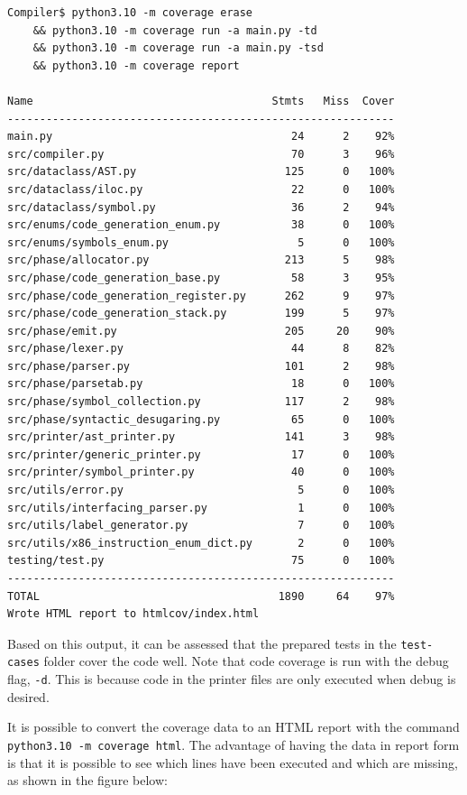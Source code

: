 \begin{verbatim}
Compiler$ python3.10 -m coverage erase
    && python3.10 -m coverage run -a main.py -td
    && python3.10 -m coverage run -a main.py -tsd 
    && python3.10 -m coverage report 

Name                                     Stmts   Miss  Cover
------------------------------------------------------------
main.py                                     24      2    92%
src/compiler.py                             70      3    96%
src/dataclass/AST.py                       125      0   100%
src/dataclass/iloc.py                       22      0   100%
src/dataclass/symbol.py                     36      2    94%
src/enums/code_generation_enum.py           38      0   100%
src/enums/symbols_enum.py                    5      0   100%
src/phase/allocator.py                     213      5    98%
src/phase/code_generation_base.py           58      3    95%
src/phase/code_generation_register.py      262      9    97%
src/phase/code_generation_stack.py         199      5    97%
src/phase/emit.py                          205     20    90%
src/phase/lexer.py                          44      8    82%
src/phase/parser.py                        101      2    98%
src/phase/parsetab.py                       18      0   100%
src/phase/symbol_collection.py             117      2    98%
src/phase/syntactic_desugaring.py           65      0   100%
src/printer/ast_printer.py                 141      3    98%
src/printer/generic_printer.py              17      0   100%
src/printer/symbol_printer.py               40      0   100%
src/utils/error.py                           5      0   100%
src/utils/interfacing_parser.py              1      0   100%
src/utils/label_generator.py                 7      0   100%
src/utils/x86_instruction_enum_dict.py       2      0   100%
testing/test.py                             75      0   100%
------------------------------------------------------------
TOTAL                                     1890     64    97%
Wrote HTML report to htmlcov/index.html
\end{verbatim}

Based on this output, it can be assessed that the prepared tests in the \texttt{test-cases} folder cover the code well. Note that code coverage is run with the debug flag, \texttt{-d}. This is because code in the printer files are only executed when debug is desired.

It is possible to convert the coverage data to an HTML report with the command \texttt{python3.10 -m coverage html}. The advantage of having the data in report form is that it is possible to see which lines have been executed and which are missing, as shown in the figure below: 

